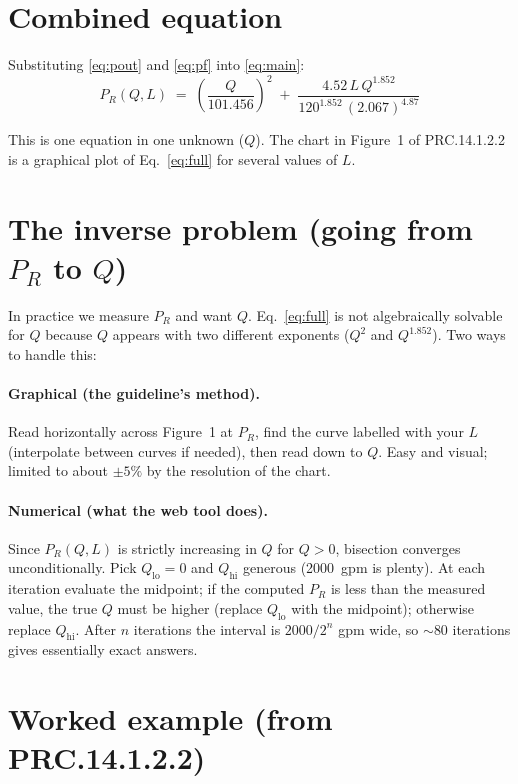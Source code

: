 \documentclass[11pt]{article}
\begin{document}
\section{Combined equation}

Substituting \eqref{eq:pout} and \eqref{eq:pf} into \eqref{eq:main}:
\begin{equation}
\boxed{\;
P_R(Q, L) \;=\; \left(\dfrac{Q}{101.456}\right)^{2}
\;+\; \dfrac{4.52\, L\, Q^{1.852}}{120^{1.852}\,(2.067)^{4.87}}
\;}
\label{eq:full}
\end{equation}

This is one equation in one unknown ($Q$). The chart in Figure~1 of
PRC.14.1.2.2 is a graphical plot of Eq.~\eqref{eq:full} for several values
of $L$.

\section{The inverse problem (going from $P_R$ to $Q$)}

In practice we measure $P_R$ and want $Q$. Eq.~\eqref{eq:full} is not
algebraically solvable for $Q$ because $Q$ appears with two different
exponents ($Q^2$ and $Q^{1.852}$). Two ways to handle this:

\paragraph{Graphical (the guideline's method).} Read horizontally across
Figure~1 at $P_R$, find the curve labelled with your $L$ (interpolate
between curves if needed), then read down to $Q$. Easy and visual;
limited to about $\pm5\%$ by the resolution of the chart.

\paragraph{Numerical (what the web tool does).} Since
$P_R(Q, L)$ is strictly increasing in $Q$ for $Q>0$, bisection converges
unconditionally. Pick $Q_{\text{lo}}=0$ and $Q_{\text{hi}}$ generous
(2000~gpm is plenty). At each iteration evaluate the midpoint; if the
computed $P_R$ is less than the measured value, the true $Q$ must be
higher (replace $Q_{\text{lo}}$ with the midpoint); otherwise replace
$Q_{\text{hi}}$. After $n$ iterations the interval is $2000/2^{n}$ gpm
wide, so $\sim 80$ iterations gives essentially exact answers.

\section{Worked example (from PRC.14.1.2.2)}
\end{document}
